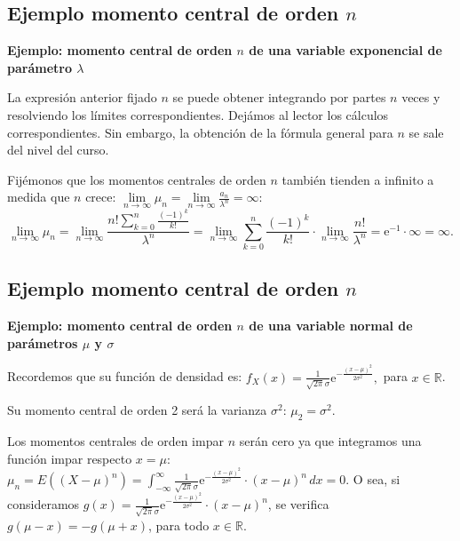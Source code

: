 \documentclass[]{book}
\begin{document}
\hypertarget{ejemplo-momento-central-de-orden-n-2}{%
\subsection{\texorpdfstring{Ejemplo momento central de orden \(n\)}{Ejemplo momento central de orden n}}\label{ejemplo-momento-central-de-orden-n-2}}

\textbf{Ejemplo: momento central de orden \(n\) de una variable exponencial de parámetro \(\lambda\)}

La expresión anterior fijado \(n\) se puede obtener integrando por partes \(n\) veces y resolviendo los límites correspondientes. Dejámos al lector los cálculos correspondientes. Sin embargo, la obtención de la fórmula general para \(n\) se sale del nivel del curso.

Fijémonos que los momentos centrales de orden \(n\) también tienden a infinito a medida que \(n\) crece: \(\lim\limits_{n\to\infty}\mu_n = \lim\limits_{n\to\infty}\frac{a_n}{\lambda^n}=\infty\):
\[
\lim_{n\to\infty}\mu_n =\lim_{n\to\infty} \frac{n!\sum\limits_{k=0}^n \frac{(-1)^k}{k!}}{\lambda^n}= 
\lim_{n\to\infty}\sum\limits_{k=0}^n \frac{(-1)^k}{k!}\cdot \lim_{n\to\infty} \frac{n!}{\lambda^n}= \mathrm{e}^{-1}\cdot \infty = \infty.
\]

\hypertarget{ejemplo-momento-central-de-orden-n-3}{%
\subsection{\texorpdfstring{Ejemplo momento central de orden \(n\)}{Ejemplo momento central de orden n}}\label{ejemplo-momento-central-de-orden-n-3}}

\textbf{Ejemplo: momento central de orden \(n\) de una variable normal de parámetros \(\mu\) y \(\sigma\)}

Recordemos que su función de densidad es: \(f_X(x)=\frac{1}{\sqrt{2\pi}\sigma}\mathrm{e}^{-\frac{(x-\mu)^2}{2\sigma^2}},\) para \(x\in \mathbb{R}\).

Su momento central de orden 2 será la varianza \(\sigma^2\): \(\mu_2 =\sigma^2.\)

Los momentos centrales de orden impar \(n\) serán cero ya que integramos una función impar respecto \(x=\mu\):
\(\mu_n = E\left((X-\mu)^n\right)=\int_{-\infty}^\infty \frac{1}{\sqrt{2\pi}\sigma}\mathrm{e}^{-\frac{(x-\mu)^2}{2\sigma^2}}\cdot (x-\mu)^n\, dx = 0.\)
O sea, si consideramos \(g(x)=\frac{1}{\sqrt{2\pi}\sigma}\mathrm{e}^{-\frac{(x-\mu)^2}{2\sigma^2}}\cdot (x-\mu)^n\), se verifica \(g(\mu-x)=-g(\mu +x)\), para todo \(x\in\mathbb{R}\).
\end{document}
